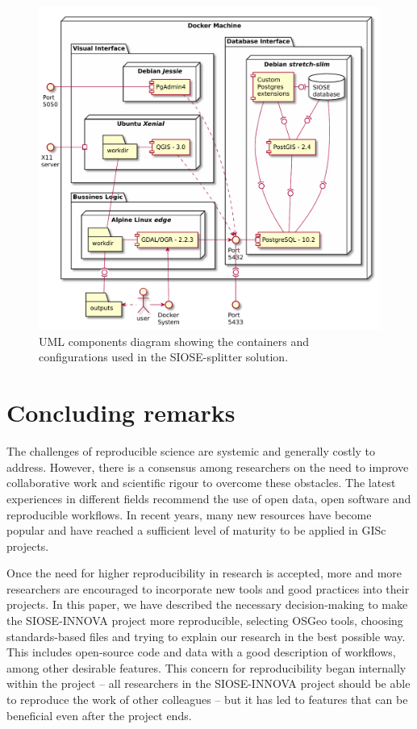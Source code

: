\documentclass[ijgi,article,submit,moreauthors,pdftex]{Definitions/mdpi}
\begin{document}
\begin{figure}[!ht]
    \centering
    \includegraphics[width=.9\textwidth]{images/siose-splitter-deployment-diagram.pdf}
    \caption{UML components diagram showing the containers and configurations used in the SIOSE-splitter solution.}
    \label{fig:siose_splitter_stack}
\end{figure}



\section{Concluding remarks}
\label{sec:conclusions}

The challenges of reproducible science are systemic and generally costly to address. However, there is a consensus among researchers on the need to improve collaborative work and scientific rigour to overcome these obstacles. The latest experiences in different fields recommend the use of open data, open software and reproducible workflows. In recent years, many new resources have become popular and have reached a sufficient level of maturity to be applied in GISc projects.

Once the need for higher reproducibility in research is accepted, more and more researchers are encouraged to incorporate new tools and good practices into their projects. In this paper, we have described the necessary decision-making to make the SIOSE-INNOVA project more reproducible, selecting OSGeo tools, choosing standards-based files and trying to explain our research in the best possible way. This includes open-source code and data with a good description of workflows, among other desirable features. This concern for reproducibility began internally within the project -- all researchers in the SIOSE-INNOVA project should be able to reproduce the work of other colleagues -- but it has led to features that can be beneficial even after the project ends.
\end{document}
